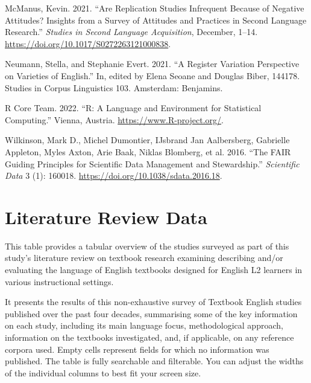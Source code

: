 \documentclass[
  letterpaper,
  DIV=11,
  numbers=noendperiod]{scrreprt}
\newlength{\cslhangindent}
\newenvironment{CSLReferences}[2] %
 {\begin{list}{}{%
  \setlength{\itemindent}{0pt}
  \setlength{\leftmargin}{0pt}
  \setlength{\parsep}{0pt}
  \ifodd #1
   \setlength{\leftmargin}{\cslhangindent}
   \setlength{\itemindent}{-1\cslhangindent}
  \fi
  \setlength{\itemsep}{#2\baselineskip}}}
 {\end{list}}
\begin{document}
\begin{CSLReferences}{1}{0}
McManus, Kevin. 2021. {``Are Replication Studies Infrequent Because of
Negative Attitudes? Insights from a Survey of Attitudes and Practices in
Second Language Research.''} \emph{Studies in Second Language
Acquisition}, December, 1--14.
\url{https://doi.org/10.1017/S0272263121000838}.

Neumann, Stella, and Stephanie Evert. 2021. {``A Register Variation
Perspective on Varieties of English.''} In, edited by Elena Seoane and
Douglas Biber, 144178. Studies in Corpus Linguistics 103. Amsterdam:
Benjamins.

R Core Team. 2022. {``R: A Language and Environment for Statistical
Computing.''} Vienna, Austria. \url{https://www.R-project.org/}.

Wilkinson, Mark D., Michel Dumontier, IJsbrand Jan Aalbersberg,
Gabrielle Appleton, Myles Axton, Arie Baak, Niklas Blomberg, et al.
2016. {``The FAIR Guiding Principles for Scientific Data Management and
Stewardship.''} \emph{Scientific Data} 3 (1): 160018.
\url{https://doi.org/10.1038/sdata.2016.18}.

\end{CSLReferences}

\cleardoublepage
{}
{}
\appendix

\chapter{Literature Review Data}\label{literature-review-data}

This table provides a tabular overview of the studies surveyed as part
of this study's literature review on textbook research examining
describing and/or evaluating the language of English textbooks designed
for English L2 learners in various instructional settings.

It presents the results of this non-exhaustive survey of Textbook
English studies published over the past four decades, summarising some
of the key information on each study, including its main language focus,
methodological approach, information on the textbooks investigated, and,
if applicable, on any reference corpora used. Empty cells represent
fields for which no information was published. The table is fully
searchable and filterable. You can adjust the widths of the individual
columns to best fit your screen size.
\end{document}
